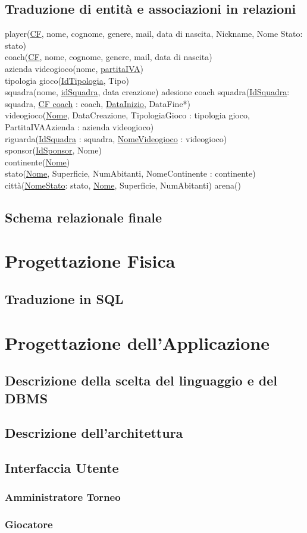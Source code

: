 \documentclass[a4paper,12pt]{report}
\begin{document}
\section{Traduzione di entità e associazioni in relazioni}
player(\underline{CF}, nome, cognome, genere, mail, data di nascita, Nickname, Nome Stato: stato) \\
coach(\underline{CF}, nome, cognome, genere, mail, data di nascita) \\
azienda videogioco(nome, \underline{partitaIVA}) \\
tipologia gioco(\underline{IdTipologia}, Tipo) \\
squadra(nome, \underline{idSquadra}, data creazione)
adesione coach squadra(\underline{IdSquadra}: squadra, \underline{CF coach} : coach, \underline{DataInizio}, DataFine*) \\
videogioco(\underline{Nome}, DataCreazione, TipologiaGioco : tipologia gioco, PartitaIVAAzienda : azienda videogioco) \\
riguarda(\underline{IdSquadra} : squadra, \underline{NomeVideogioco} : videogioco) \\
sponsor(\underline{IdSponsor}, Nome) \\
continente(\underline{Nome}) \\
stato(\underline{Nome}, Superficie, NumAbitanti, NomeContinente : continente) \\
città(\underline{NomeStato}: stato, \underline{Nome}, Superficie, NumAbitanti)
arena()



\section{Schema relazionale finale}


\chapter{Progettazione Fisica}
\section{Traduzione in SQL}


\chapter{Progettazione dell'Applicazione}
\section{Descrizione della scelta del linguaggio e del DBMS}
\section{Descrizione dell'architettura}
\section{Interfaccia Utente}
\subsection{Amministratore Torneo}
\subsection{Giocatore}
\end{document}
